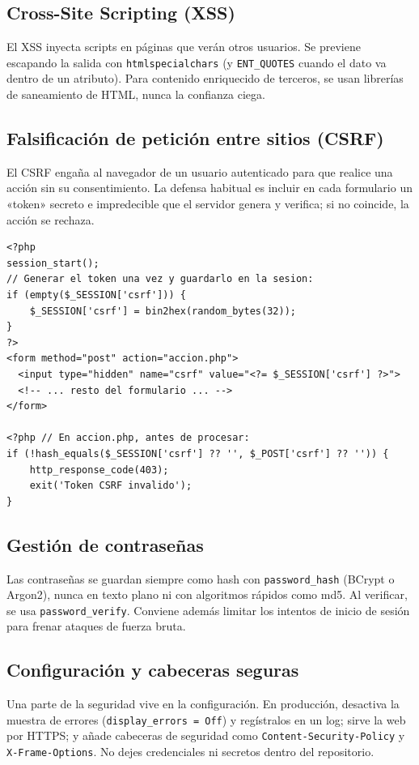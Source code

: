 \documentclass[11pt]{article}
\begin{document}
\subsection{Cross-Site Scripting (XSS)}
El XSS inyecta scripts en páginas que verán otros usuarios. Se previene escapando la salida con \texttt{htmlspecialchars} (y \texttt{ENT\_QUOTES} cuando el dato va dentro de un atributo). Para contenido enriquecido de terceros, se usan librerías de saneamiento de HTML, nunca la confianza ciega.

\subsection{Falsificación de petición entre sitios (CSRF)}
El CSRF engaña al navegador de un usuario autenticado para que realice una acción sin su consentimiento. La defensa habitual es incluir en cada formulario un «token» secreto e impredecible que el servidor genera y verifica; si no coincide, la acción se rechaza.

\begin{cajacodigo}
\begin{lstlisting}[style=php]
<?php
session_start();
// Generar el token una vez y guardarlo en la sesion:
if (empty($_SESSION['csrf'])) {
    $_SESSION['csrf'] = bin2hex(random_bytes(32));
}
?>
<form method="post" action="accion.php">
  <input type="hidden" name="csrf" value="<?= $_SESSION['csrf'] ?>">
  <!-- ... resto del formulario ... -->
</form>

<?php // En accion.php, antes de procesar:
if (!hash_equals($_SESSION['csrf'] ?? '', $_POST['csrf'] ?? '')) {
    http_response_code(403);
    exit('Token CSRF invalido');
}
\end{lstlisting}
\end{cajacodigo}
\vspace{2pt}
\subsection{Gestión de contraseñas}
Las contraseñas se guardan siempre como hash con \texttt{password\_hash} (BCrypt o Argon2), nunca en texto plano ni con algoritmos rápidos como md5. Al verificar, se usa \texttt{password\_verify}. Conviene además limitar los intentos de inicio de sesión para frenar ataques de fuerza bruta.

\subsection{Configuración y cabeceras seguras}
Una parte de la seguridad vive en la configuración. En producción, desactiva la muestra de errores (\texttt{display\_errors =\allowbreak{} Off}) y regístralos en un log; sirve la web por HTTPS; y añade cabeceras de seguridad como \texttt{Content-Security-Policy} y \texttt{X-Frame-Options}. No dejes credenciales ni secretos dentro del repositorio.
\end{document}
